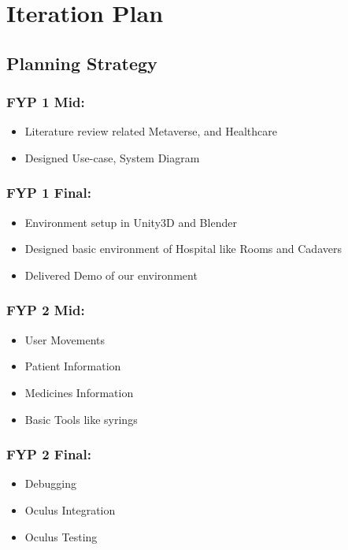 \chapter{Iteration Plan}
\label{ch:iter0}
\section{Planning Strategy}

\subsection{FYP 1 Mid:}
 
\begin{itemize}
	\item Literature review related Metaverse, and Healthcare
	\item Designed Use-case, System Diagram
\end{itemize}

\subsection{FYP 1 Final:}
\begin{itemize}
	\item Environment setup in Unity3D and Blender 
	\item Designed basic environment of Hospital like Rooms and Cadavers
	\item Delivered Demo of our environment
	
\end{itemize}


\subsection{FYP 2 Mid:}
\begin{itemize}
	\item User Movements
	\item Patient Information
	\item Medicines Information
	\item Basic Tools like syrings
\end{itemize}

\subsection{FYP 2 Final:}
\begin{itemize}
	\item Debugging
	\item Oculus Integration 
	\item Oculus Testing
\end{itemize}
